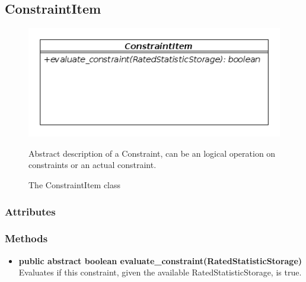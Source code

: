 \subsection{ConstraintItem}
\begin{figure}[htbp]
	\begin{minipage}[t]{8cm}
		\vspace{0pt}
		\centering
		\includegraphics[scale=0.6]{./diagram_pictures/reactor/ConstraintItem.png}
		\caption{The ConstraintItem class}
	\end{minipage}
	\hfill
	\begin{minipage}[t]{6.5cm}
		\vspace{10pt}
			Abstract description of a Constraint, can be an logical operation on constraints or an actual constraint.
	\end{minipage}
\end{figure}  


\subsubsection{Attributes}
\subsubsection{Methods}
\begin{itemize}
	\item \textbf{ public abstract boolean evaluate\_constraint(RatedStatisticStorage) }\\
	Evaluates if this constraint, given the available RatedStatisticStorage, is true. 
\end{itemize}		


\newpage

